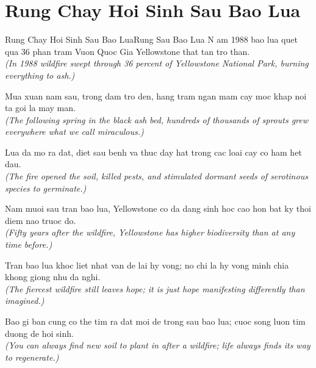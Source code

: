\section{Rung Chay Hoi Sinh Sau Bao Lua}
\begin{truyen}{Rung Chay Hoi Sinh Sau Bao Lua}{Rung Sau Bao Lua}
N am 1988 bao lua quet qua 36 phan tram Vuon Quoc Gia Yellowstone that tan tro than.\\
\textit{(In 1988 wildfire swept through 36 percent of Yellowstone National Park, burning everything to ash.)}

Mua xuan nam sau, trong dam tro den, hang tram ngan mam cay moc khap noi ta goi la may man.\\
\textit{(The following spring in the black ash bed, hundreds of thousands of sprouts grew everywhere what we call miraculous.)}

Lua da mo ra dat, diet sau benh va thuc day hat trong cac loai cay co ham het dau.\\
\textit{(The fire opened the soil, killed pests, and stimulated dormant seeds of serotinous species to germinate.)}

Nam muoi sau tran bao lua, Yellowstone co da dang sinh hoc cao hon bat ky thoi diem nao truoc do.\\
\textit{(Fifty years after the wildfire, Yellowstone has higher biodiversity than at any time before.)}

Tran bao lua khoc liet nhat van de lai hy vong; no chi la hy vong minh chia khong giong nhu da nghi.\\
\textit{(The fiercest wildfire still leaves hope; it is just hope manifesting differently than imagined.)}

\end{truyen}
\begin{baihoc}
  Bao gi ban cung co the tim ra dat moi de trong sau bao lua; cuoc song luon tim duong de hoi sinh.\\
  \textit{(You can always find new soil to plant in after a wildfire; life always finds its way to regenerate.)}
\end{baihoc}

